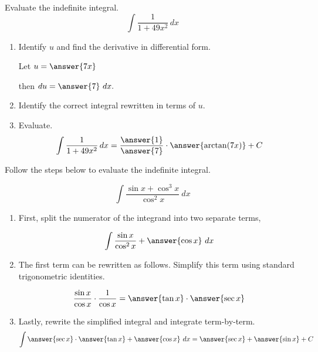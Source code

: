 \documentclass{ximera}
\begin{document}
\begin{problem}
Evaluate the indefinite integral.
\[
\int \frac{1}{1 + 49x^2} \, dx
\]

\begin{enumerate}
\item Identify $u$ and find the derivative in differential form. 

Let $u = \answer{7x}$ 

then $du = \answer{7} \ dx.$

\item Identify the correct integral rewritten in terms of $u.$
\begin{multipleChoice}
\end{multipleChoice}

\item Evaluate.  
\[
\int \frac{1}{1 + 49x^2} \, dx = \frac{ \answer{1} }{ \answer{7}} \cdot \answer{\arctan(7x)} + C
\]
\end{enumerate}
\end{problem}



\begin{problem}
Follow the steps below to evaluate the indefinite integral.

\[
\int \frac{\sin x + \cos^3 x }{\cos^2 x} \ dx
\]

\begin{enumerate}
\item First, split the numerator of the integrand into two separate terms,

\[
\int \frac{\sin x}{\cos^2 x} + \answer{\cos x}  \ dx
\]

\item The first term can be rewritten as follows.  Simplify this term using standard trigonometric identities.

\[ \frac{\sin x}{\cos x} \cdot \frac{1}{\cos x} = \answer{\tan x} \cdot \answer{\sec x} \]

\item Lastly, rewrite the simplified integral and integrate term-by-term.
\[
\int \answer{\sec x} \cdot \answer{\tan x} + \answer{\cos x} \ dx = \answer{\sec x} + \answer{\sin x} + C
\]

\end{enumerate}
\end{problem}
\end{document}
